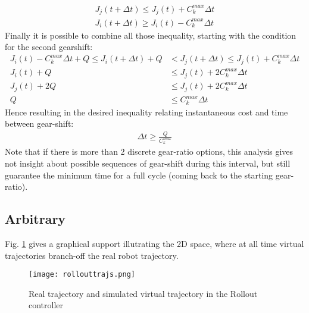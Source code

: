 %
\begin{align}
J_j(t+\Delta t) \leq J_j(t)  + C_k^{max} \Delta t \\
J_i(t+\Delta t) \geq J_i(t)  - C_k^{max} \Delta t 
\end{align}
%
Finally it is possible to combine all those inequality, starting with the condition for the second gearshift:
%
\begin{align}
J_i(t)  - C_k^{max} \Delta t + Q \leq J_i(t+\Delta t) + Q &< J_j(t+\Delta t) \leq J_j(t)  + C_k^{max} \Delta t \\
J_i(t) + Q &\leq J_j(t)  + 2 C_k^{max} \Delta t \\
J_j(t) + 2 Q &\leq J_j(t)  + 2 C_k^{max} \Delta t \\
Q &\leq C_k^{max} \Delta t 
\end{align}
%
Hence resulting in the desired inequality relating instantaneous cost and time between gear-shift:
%
\begin{align}
\Delta t \geq \frac{Q}{C_k^{max}}
\end{align}
%
Note that if there is more than 2 discrete gear-ratio options, this analysis gives not insight about possible sequences of gear-shift during this interval, but still guarantee the minimum time for a full cycle (coming back to the starting gear-ratio).

\subsection{Arbitrary}
\label{sec:chat2}

Fig. \ref{fig:rollouttrajs} gives a graphical support illutrating the 2D space, where at all time virtual trajectories branch-off the real robot trajectory.

\begin{figure}[H]
	\centering
		\texttt{[image: rollouttrajs.png]}
	\caption{Real trajectory and simulated virtual trajectory in the Rollout controller}
	\label{fig:rollouttrajs}
\end{figure}


